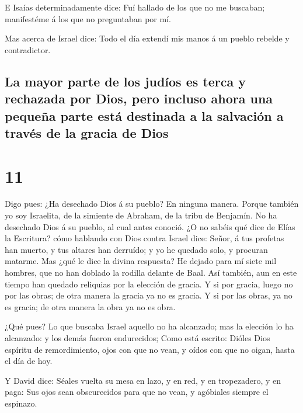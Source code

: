  E Isaías determinadamente dice: Fuí hallado de los que no
me buscaban; manifestéme á los que no preguntaban por mí.

 Mas acerca de Israel dice: Todo el día extendí mis manos á
un pueblo rebelde y contradictor.

\hypertarget{la-mayor-parte-de-los-juduxedos-es-terca-y-rechazada-por-dios-pero-incluso-ahora-una-pequeuxf1a-parte-estuxe1-destinada-a-la-salvaciuxf3n-a-travuxe9s-de-la-gracia-de-dios}{%
\subsection{La mayor parte de los judíos es terca y rechazada por Dios,
pero incluso ahora una pequeña parte está destinada a la salvación a
través de la gracia de
Dios}\label{la-mayor-parte-de-los-juduxedos-es-terca-y-rechazada-por-dios-pero-incluso-ahora-una-pequeuxf1a-parte-estuxe1-destinada-a-la-salvaciuxf3n-a-travuxe9s-de-la-gracia-de-dios}}

\hypertarget{section-10}{%
\section{11}\label{section-10}}

 Digo pues: ¿Ha desechado Dios á su pueblo? En ninguna
manera. Porque también yo soy Israelita, de la simiente de Abraham, de
la tribu de Benjamín.  No ha desechado Dios á su pueblo, al
cual antes conoció. ¿O no sabéis qué dice de Elías la Escritura? cómo
hablando con Dios contra Israel dice:  Señor, á tus profetas
han muerto, y tus altares han derruído; y yo he quedado solo, y procuran
matarme.  Mas ¿qué le dice la divina respuesta? He dejado
para mí siete mil hombres, que no han doblado la rodilla delante de
Baal.  Así también, aun en este tiempo han quedado reliquias
por la elección de gracia.  Y si por gracia, luego no por
las obras; de otra manera la gracia ya no es gracia. Y si por las obras,
ya no es gracia; de otra manera la obra ya no es obra.

 ¿Qué pues? Lo que buscaba Israel aquello no ha alcanzado;
mas la elección lo ha alcanzado: y los demás fueron endurecidos;
 Como está escrito: Dióles Dios espíritu de remordimiento,
ojos con que no vean, y oídos con que no oigan, hasta el día de hoy.

 Y David dice: Séales vuelta su mesa en lazo, y en red, y en
tropezadero, y en paga:  Sus ojos sean obscurecidos para
que no vean, y agóbiales siempre el espinazo.

